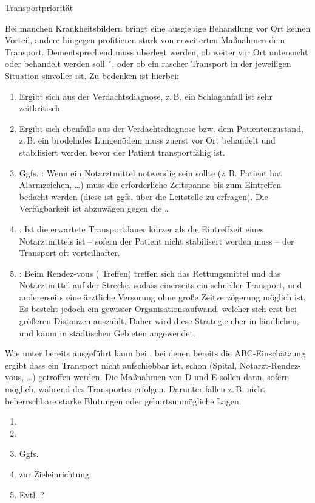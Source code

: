 {Transportpriorität}
{Bei manchen Krankheitsbildern bringt eine ausgiebige
Behandlung vor Ort keinen Vorteil, andere hingegen
profitieren stark von erweiterten Maßnahmen  dem
Transport. Dementsprechend muss überlegt werden, ob weiter
vor Ort untersucht oder behandelt werden soll ´, oder ob ein
rascher Transport in der jeweiligen Situation sinvoller ist.
Zu bedenken ist hierbei:

\begin{enumerate}
  \item {} Ergibt sich aus der
  Verdachtsdiagnose, z.\,B. ein Schlaganfall ist sehr
  zeitkritisch
  \item {} Ergibt sich ebenfalls
  aus der Verdachtsdiagnose bzw. dem Patientenzustand, z.\,B.
  ein brodelndes Lungenödem muss zuerst vor Ort behandelt und stabilisiert werden
  bevor der Patient transportfähig ist.
  \item Ggfs. : Wenn
  ein Notarztmittel notwendig sein sollte (z.\,B. Patient hat
  Alarmzeichen, \ldots) muss die erforderliche Zeitspanne
  bis zum Eintreffen bedacht werden (diese ist ggfs. über
  die Leitstelle zu erfragen). Die Verfügbarkeit ist
  abzuwägen gegen die \ldots
  \item {}: Ist die
  erwartete Transportdauer kürzer als die Eintreffzeit eines
  Notarztmittels ist -- sofern der Patient nicht stabilisert
  werden muss -- der Transport oft vorteilhafter. 
  \item {}: Beim Rendez-vous (
  Treffen) treffen sich das Rettungsmittel und das
  Notarztmittel auf der Strecke, sodass einerseits ein
  schneller Transport, und andererseits eine ärztliche
  Versorung ohne große Zeitverzögerung möglich ist. Es
  besteht jedoch ein gewisser Organisationsaufwand, welcher
  sich erst bei größeren Distanzen auszahlt. Daher wird
  diese Strategie eher in ländlichen, und kaum in
  städtischen Gebieten angewendet.
\end{enumerate}

Wie unter 
bereits ausgeführt kann bei 
, bei denen bereits die 
ABC-Einschätzung ergibt dass ein Transport nicht aufschiebbar ist, 
schon  (Spital, 
Notarzt-Rendez-vous, \ldots) getroffen werden. 
Die Maßnahmen von D und E sollen dann, sofern möglich, während des 
Transportes erfolgen. 
Darunter fallen z.\,B. nicht beherrschbare starke 
Blutungen oder geburtsunmögliche Lagen.

}
{
\begin{enumerate}
  \item {} 
  \item {} 
  \item Ggfs. 
  \item {} zur Zieleinrichtung
  \item Evtl. ?
\end{enumerate}
}
{}
{}
{}


